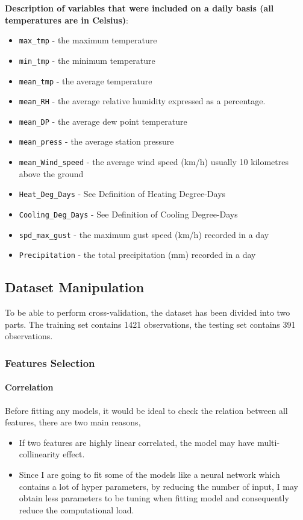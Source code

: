 \documentclass[a4paper,11pt]{article}
\begin{document}
\textbf{Description of variables that were included on a daily basis (all temperatures are in Celsius)}:
\begin{itemize}
  \item \verb|max_tmp| - the maximum temperature 
  \item \verb|min_tmp| - the minimum temperature 
  \item \verb|mean_tmp| - the average temperature 
  \item \verb|mean_RH| - the average relative humidity expressed as a percentage.
  \item \verb|mean_DP| - the average dew point temperature
  \item \verb|mean_press| - the average station pressure
  \item \verb|mean_Wind_speed| - the average wind speed (km/h) usually 10 kilometres above the ground
  \item \verb|Heat_Deg_Days| - See Definition of Heating Degree-Days
  \item \verb|Cooling_Deg_Days| - See Definition of Cooling Degree-Days
  \item \verb|spd_max_gust| - the maximum gust speed (km/h) recorded in a day
  \item \verb|Precipitation| - the total precipitation (mm) recorded in a day
\end{itemize} 

\subsection{Dataset Manipulation}

To be able to perform cross-validation, the dataset has been divided into two parts. The training set contains 1421 observations, the testing set contains 391 observations.\par

\subsubsection{Features Selection}

\paragraph{Correlation} Before fitting any models, it would be ideal to check the relation between all features, there are two main reasons, 
\begin{itemize}
	\item If two features are highly linear correlated, the model may have multi-collinearity effect.
	\item Since I are going to fit some of the models like a neural network which contains a lot of hyper parameters, by reducing the number of input, I may obtain less parameters to be tuning when fitting model and consequently reduce the computational load.
\end{itemize}
\end{document}
